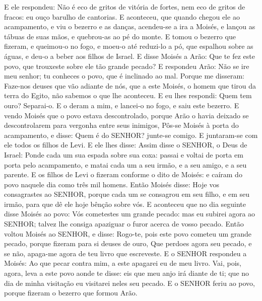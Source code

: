 {E ele respondeu: Não é eco de gritos de vitória de fortes, nem eco de gritos de fracos: eu ouço barulho de cantorias.
E aconteceu, que quando chegou ele ao acampamento, e viu o bezerro e as danças, acendeu-se a ira a Moisés, e lançou as tábuas de suas mãos, e quebrou-as ao pé do monte.
E tomou o bezerro que fizeram, e queimou-o no fogo, e moeu-o até reduzi-lo a pó, que espalhou sobre as águas, e deu-o a beber aos filhos de Israel.
E disse Moisés a Arão: Que te fez este povo, que trouxeste sobre ele tão grande pecado?
E respondeu Arão: Não se ire meu senhor; tu conheces o povo, que é inclinado ao mal.
Porque me disseram: Faze-nos deuses que vão adiante de nós, que a este Moisés, o homem que tirou da terra do Egito, não sabemos o que lhe aconteceu.
E eu lhes respondi: Quem tem ouro? Separai-o. E o deram a mim, e lancei-o no fogo, e saiu este bezerro.
E vendo Moisés que o povo estava descontrolado, porque Arão o havia deixado se descontrolarem para vergonha entre seus inimigos,
Pôs-se Moisés à porta do acampamento, e disse: Quem é do SENHOR? junte-se comigo. E juntaram-se com ele todos os filhos de Levi.
E ele lhes disse: Assim disse o SENHOR, o Deus de Israel: Ponde cada um sua espada sobre sua coxa: passai e voltai de porta em porta pelo acampamento, e matai cada um a seu irmão, e a seu amigo, e a seu parente.
E os filhos de Levi o fizeram conforme o dito de Moisés: e caíram do povo naquele dia como três mil homens.
Então Moisés disse: Hoje vos consagrastes ao SENHOR, porque cada um se consagrou em seu filho, e em seu irmão, para que dê ele hoje bênção sobre vós.
E aconteceu que no dia seguinte disse Moisés ao povo: Vós cometestes um grande pecado: mas eu subirei agora ao SENHOR; talvez lhe consiga apaziguar o furor acerca de vosso pecado.
Então voltou Moisés ao SENHOR, e disse: Rogo-te, pois este povo cometeu um grande pecado, porque fizeram para si deuses de ouro,
Que perdoes agora seu pecado, e se não, apaga-me agora de teu livro que escreveste.
E o SENHOR respondeu a Moisés: Ao que pecar contra mim, a este apagarei eu de meu livro.
Vai, pois, agora, leva a este povo aonde te disse: eis que meu anjo irá diante de ti; que no dia de minha visitação eu visitarei neles seu pecado.
E o SENHOR feriu ao povo, porque fizeram o bezerro que formou Arão.

}
